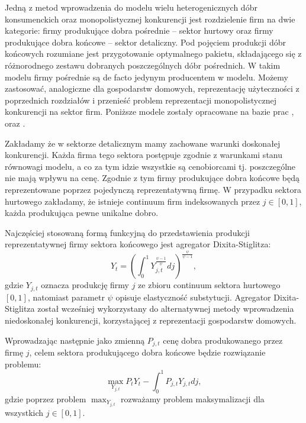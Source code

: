 Jedną z metod wprowadzenia do modelu wielu heterogenicznych dóbr konsumenckich oraz monopolistycznej konkurencji jest rozdzielenie firm na dwie kategorie: firmy produkujące dobra pośrednie -- sektor hurtowy oraz firmy produkujące dobra końcowe -- sektor detaliczny. Pod pojęciem produkcji dóbr końcowych rozumiane jest przygotowanie optymalnego pakietu, składającego się z różnorodnego zestawu dobranych poszczególnych dóbr pośrednich. W takim modelu firmy pośrednie są de facto jedynym producentem w modelu. Możemy zastosować, analogiczne dla gospodarstw domowych, reprezentację użyteczności z poprzednich rozdziałów i przenieść problem reprezentacji monopolistycznej konkurencji na sektor firm. Poniższe modele zostały opracowane na bazie prac \cite{nominal_rigidities}, \cite{gali_gov_spending} oraz \cite{costaBook}.

Zakładamy że w sektorze detalicznym mamy zachowane warunki doskonałej konkurencji. Każda firma tego sektora postępuje zgodnie z warunkami stanu równowagi modelu, a co za tym idzie wszystkie są cenobiorcami tj. poszczególne nie mają wpływu na cenę. Zgodnie z tym firmy produkujące dobra końcowe będą reprezentowane poprzez pojedynczą reprezentatywną firmę. W przypadku sektora hurtowego zakładamy, że istnieje continuum firm indeksowanych przez $j \in [0,1]$, każda produkująca pewne unikalne dobro. 

Najczęściej stosowaną formą funkcyjną do przedstawienia produkcji reprezentatywnej firmy sektora końcowego jest agregator Dixita-Stiglitza\cite{stiglitzCES}:
\begin{equation}
    \label{eqn:final_good_production}
    Y_t = \left(\int_0^1 Y_{j,t}^{\frac{\psi-1}{\psi}}dj\right)^{\frac{\psi}{\psi-1}},
\end{equation}
gdzie $Y_{j,t}$ oznacza produkcję firmy $j$ ze zbioru continuum sektora hurtowego $[0,1]$, natomiast parametr $\psi$ opisuje elastyczność substytucji. Agregator Dixita-Stiglitza został wcześniej wykorzystany do alternatywnej metody wprowadzenia niedoskonałej konkurencji, korzystającej z reprezentacji gospodarstw domowych.

Wprowadzając następnie jako zmienną $P_{j,t}$ cenę dobra produkowanego przez firmę $j$, celem sektora produkującego dobra końcowe będzie rozwiązanie problemu:
\begin{equation}
    \label{eqn:final_good_problem}
    \max_{Y_{j,t}} P_t Y_t - \int_0^1P_{j,t}Y_{j,t} dj,
\end{equation}
gdzie poprzez problem $\max_{Y_{j,t}}$ rozważamy problem maksymalizacji dla wszystkich $j \in [0,1]$.

